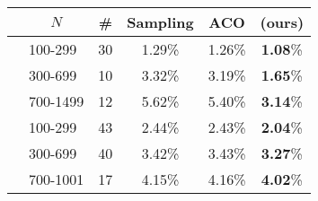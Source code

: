 
\begin{tabular}{clcccc}
\midrule
& \multicolumn{1}{c}{$N$} & \# & Sampling & ACO & \ours{} (ours) \\
\midrule
\parbox[t]{2mm}{} & 100-299 & 30& 1.29\%& 1.26\%& \textbf{1.08}\% \\
& 300-699 & 10 & 3.32\% &3.19\% & \textbf{1.65}\% \\
& 700-1499 & 12 &5.62\% &5.40\% & \textbf{3.14}\% \\
\midrule
\parbox[t]{2mm}{} & 100-299 & 43 &2.44\% &2.43\% & \textbf{2.04}\% \\
& 300-699 & 40 &3.42\% &3.43\% & \textbf{3.27}\% \\
& 700-1001 & 17 &4.15\% &4.16\% & \textbf{4.02}\% \\

\bottomrule
\end{tabular}